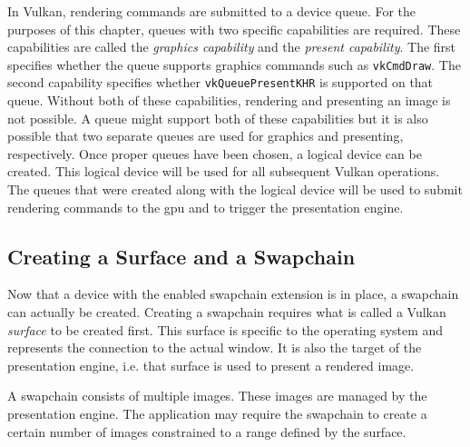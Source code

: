       In Vulkan, rendering commands are submitted to a device queue.
      For the purposes of this chapter, queues with two specific capabilities are required.
      These capabilities are called the \textit{graphics capability} and the \textit{present capability}.
      The first specifies whether the queue supports graphics commands such as \lstinline{vkCmdDraw}.
      The second capability specifies whether \lstinline{vkQueuePresentKHR} is supported on that queue.
      Without both of these capabilities, rendering and presenting an image is not possible.
      A queue might support both of these capabilities but it is also possible that two separate queues are used for graphics and presenting, respectively.
      Once proper queues have been chosen, a logical device can be created.
      This logical device will be used for all subsequent Vulkan operations.
      The queues that were created along with the logical device will be used to submit rendering commands to the \gls{gpu} and to trigger the presentation engine.

    \subsection{Creating a Surface and a Swapchain}
      Now that a device with the enabled swapchain extension is in place, a swapchain can actually be created.
      Creating a swapchain requires what is called a Vulkan \textit{surface} to be created first.
      This surface is specific to the operating system and represents the connection to the actual window.
      It is also the target of the presentation engine, i.e. that surface is used to present a rendered image.

      A swapchain consists of multiple images.
      These images are managed by the presentation engine.
      The application may require the swapchain to create a certain number of images constrained to a range defined by the surface.

